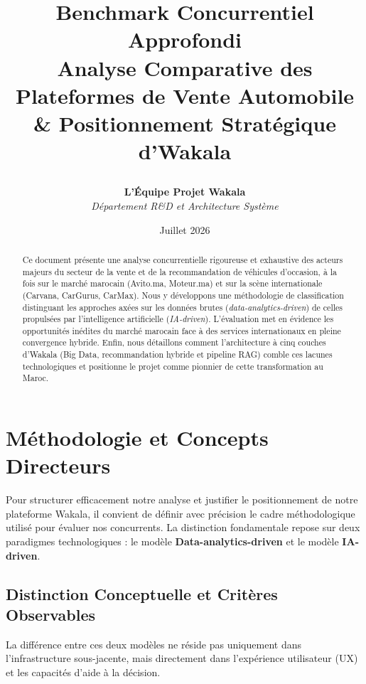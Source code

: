 \documentclass[11pt,a4paper]{article}
\title{

    \Huge\bfseries Benchmark Concurrentiel Approfondi\\[0.4cm]
    \Large Analyse Comparative des Plateformes de Vente Automobile \& Positionnement Stratégique d'Wakala
}
\author{
    \textbf{L'Équipe Projet Wakala}\\
    \textit{Département R\&D et Architecture Système}
}
\date{Juillet 2026}
\begin{document}
\maketitle

\begin{abstract}
Ce document présente une analyse concurrentielle rigoureuse et exhaustive des acteurs majeurs du secteur de la vente et de la recommandation de véhicules d'occasion, à la fois sur le marché marocain (Avito.ma, Moteur.ma) et sur la scène internationale (Carvana, CarGurus, CarMax). Nous y développons une méthodologie de classification distinguant les approches axées sur les données brutes (\textit{data-analytics-driven}) de celles propulsées par l'intelligence artificielle (\textit{IA-driven}). L'évaluation met en évidence les opportunités inédites du marché marocain face à des services internationaux en pleine convergence hybride. Enfin, nous détaillons comment l'architecture à cinq couches d'Wakala (Big Data, recommandation hybride et pipeline RAG) comble ces lacunes technologiques et positionne le projet comme pionnier de cette transformation au Maroc.
\end{abstract}

\newpage
\tableofcontents
\newpage

\section{Méthodologie et Concepts Directeurs}

Pour structurer efficacement notre analyse et justifier le positionnement de notre plateforme Wakala, il convient de définir avec précision le cadre méthodologique utilisé pour évaluer nos concurrents. La distinction fondamentale repose sur deux paradigmes technologiques : le modèle \textbf{Data-analytics-driven} et le modèle \textbf{IA-driven}.

\subsection{Distinction Conceptuelle et Critères Observables}
La différence entre ces deux modèles ne réside pas uniquement dans l'infrastructure sous-jacente, mais directement dans l'expérience utilisateur (UX) et les capacités d'aide à la décision. 
\end{document}
